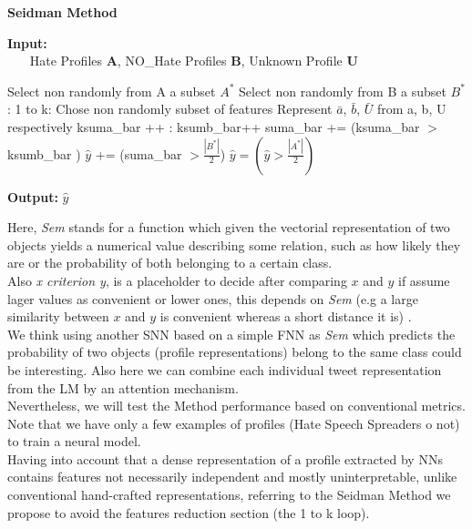 \documentclass[11pt]{article}
\begin{document}
			\begin{algorithm}[!tbh]
		\caption{\textbf{Seidman Method}} 
		\hspace*{\algorithmicindent} \textbf{Input:} \\
		$~~~~~~~~$Hate Profiles \textbf{A}, NO\_Hate Profiles \textbf{B}, Unknown Profile\textbf{ U}
		\begin{algorithmic}[1]
			\State Select non randomly from A a subset $A^*$
			\State Select non randomly from B a subset $B^*$
			\Loop: 1 to k:
			\State Chose non randomly subset of features
			\State Represent $\bar{a}$, $\bar{b}$, $\bar{U}$ from a, b, U respectively
			\State ksuma\_bar ++
			\Else: 
			\State ksumb\_bar++
			\EndIf
			\EndLoop
			\State suma\_bar += (ksuma\_bar $>$ksumb\_bar  )
			\EndFor			
			\State $\hat{y}$ 	+=  (suma\_bar  $>\frac{|B^*|}{2}$)
			\EndFor					
			\State $\hat{y} = (\hat{y}  > \frac{|A^*|}{2})$
			\EndProcedure
			
			\hspace*{\algorithmicindent} \textbf{Output:}  $\hat{y}$
		\end{algorithmic}
	\end{algorithm}
	
	Here, \textit{Sem} stands for a function which given the vectorial representation of two objects yields a numerical value describing some relation, such as how likely they are or the probability of both belonging to a certain class. \\
	Also \textit{x criterion y}, is a placeholder to decide after comparing $x$ and $y$ if assume lager values as convenient or lower ones, this depends on \textit{Sem} (e.g a large similarity between $x$ and $y$  is convenient whereas a short distance it is) . \\
	
	We think using another SNN based on a simple FNN  as \textit{Sem} which predicts the probability of two objects (profile representations) belong to the same class could be interesting.  Also here we can combine each individual tweet representation from the LM by an attention mechanism.\\	
	Nevertheless, we will test the Method performance based on conventional metrics. Note that we have only a few examples of profiles (Hate Speech Spreaders o not) to train a neural model.\\
	
	Having into account that a dense representation of a profile extracted by NNs contains features not necessarily independent and mostly uninterpretable, unlike conventional hand-crafted representations, referring to the Seidman Method we propose to avoid the features reduction section (the 1 to k loop).
\end{document}
